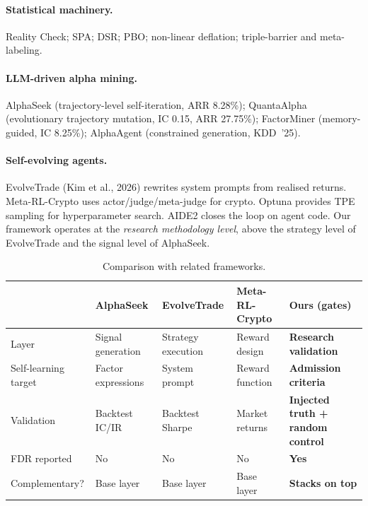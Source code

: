 \documentclass[11pt]{article}
\begin{document}
\paragraph{Statistical machinery.}
\citet{white2000} Reality Check; \citet{hansen2005} SPA;
\citet{dsr} DSR; \citet{pbo} PBO; \citet{harveyliu} non-linear deflation;
\citet{lopdeprado} triple-barrier and meta-labeling.

\paragraph{LLM-driven alpha mining.}
AlphaSeek \citep{alphaseek} (trajectory-level self-iteration, ARR 8.28\%);
QuantaAlpha \citep{quantaalpha} (evolutionary trajectory mutation, IC 0.15,
ARR 27.75\%); FactorMiner \citep{factorMiner} (memory-guided, IC 8.25\%);
AlphaAgent \citep{alphaagent} (constrained generation, KDD~'25).

\paragraph{Self-evolving agents.}
EvolveTrade (Kim et al., 2026) rewrites system prompts from realised returns.
Meta-RL-Crypto \citep{metarlcrypto} uses actor/judge/meta-judge for crypto.
Optuna \citep{optuna} provides TPE sampling for hyperparameter search.
AIDE2 \citep{aide2} closes the loop on agent code. Our framework operates at
the \emph{research methodology level}, above the strategy level of
EvolveTrade and the signal level of AlphaSeek.

\begin{table}[htbp]
\centering
\caption{Comparison with related frameworks.}
\label{tab:compare}
\small
\begin{tabular}{@{}lp{2.0cm}p{2.0cm}p{2.0cm}p{2.8cm}@{}}
\toprule
 & \textbf{AlphaSeek} & \textbf{EvolveTrade} & \textbf{Meta-RL-Crypto} & \textbf{Ours (gates)} \\
\midrule
Layer & Signal generation & Strategy execution & Reward design & \textbf{Research validation} \\
Self-learning target & Factor expressions & System prompt & Reward function & \textbf{Admission criteria} \\
Validation & Backtest IC/IR & Backtest Sharpe & Market returns & \textbf{Injected truth + random control} \\
FDR reported & No & No & No & \textbf{Yes} \\
Complementary? & Base layer & Base layer & Base layer & \textbf{Stacks on top} \\
\bottomrule
\end{tabular}
\end{table}
\end{document}
